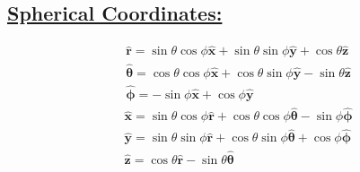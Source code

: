 \documentclass[a4paper,12pt]{article}
\begin{document}
\subsection*{\underline{Spherical Coordinates:}}
$$
\begin{aligned}
&\hat{\mathbf{r}}=\sin \theta \cos \phi \hat{\mathbf{x}}+\sin \theta \sin \phi \hat{\mathbf{y}}+\cos \theta \hat{\mathbf{z}} \\
&\hat{\boldsymbol{\theta}}=\cos \theta \cos \phi \hat{\mathbf{x}}+\cos \theta \sin \phi \hat{\mathbf{y}}-\sin \theta \hat{\mathbf{z}} \\
&\hat{\boldsymbol{\phi}}=-\sin \phi \hat{\mathbf{x}}+\cos \phi \hat{\mathbf{y}}
\end{aligned}
$$
$$
\begin{aligned}
&\hat{\mathbf{x}}=\sin \theta \cos \phi \hat{\mathbf{r}}+\cos \theta \cos \phi \hat{\boldsymbol{\theta}}-\sin \phi \hat{\boldsymbol{\phi}} \\
&\hat{\mathbf{y}}=\sin \theta \sin \phi \hat{\mathbf{r}}+\cos \theta \sin \phi \hat{\boldsymbol{\theta}}+\cos \phi \hat{\boldsymbol{\phi}} \\
&\hat{\mathbf{z}}=\cos \theta \hat{\mathbf{r}}-\sin \theta \hat{\boldsymbol{\theta}}
\end{aligned}
$$
\end{document}
